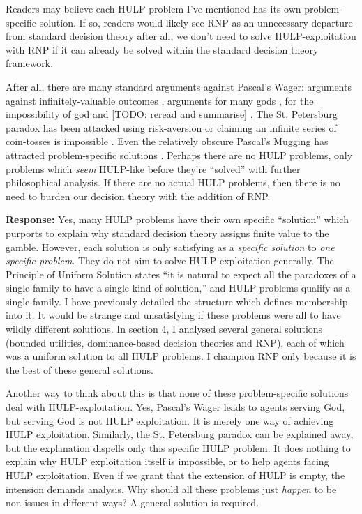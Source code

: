 \documentclass{article}
\providecommand{\DIFadd}[1]{{\protect\color{blue}\uwave{#1}}} %
\providecommand{\DIFdel}[1]{{\protect\color{red}\sout{#1}}}                      %
\providecommand{\DIFaddbegin}{} %
\providecommand{\DIFaddend}{} %
\providecommand{\DIFdelbegin}{} %
\providecommand{\DIFdelend}{} %
\begin{document}
Readers may believe each HULP problem I've mentioned has its own problem-specific solution. If so, readers would likely see RNP as an unnecessary departure from standard decision theory \textemdash{} after all, we don't need to solve \DIFdelbegin \DIFdel{HULP-exploitation }\DIFdelend \DIFaddbegin \DIFadd{HULP exploitation }\DIFaddend with RNP if it can already be solved within the standard decision theory framework.

After all, there are many standard arguments against Pascal's Wager: arguments against infinitely-valuable outcomes \citep{mcclennen1994pascal}, arguments for many gods \citep{saka2001pascal}, for the impossibility of god \citep{oppy1991rescher} and [TODO: reread and summarise] \citep{hajek2003waging}. The St. Petersburg paradox has been attacked using risk-aversion \citep{weirich1984st} or claiming an infinite series of coin-tosses is impossible \citep[pg. 154]{jeffrey1990logic}. Even the relatively obscure Pascal's Mugging has attracted problem-specific solutions \citep{baumann2009counting}. Perhaps there are no HULP problems, only problems which \textit{seem} HULP-like before they're ``solved'' with further philosophical analysis. If there are no actual HULP problems, then there is no need to burden our decision theory with the addition of RNP.

\textbf{Response:} Yes, many HULP problems have their own specific ``solution'' which purports to explain why standard decision theory assigns finite value to the gamble. However, each solution is only satisfying as a \textit{specific solution} to \textit{one specific problem}. They do not aim to solve HULP exploitation generally. The Principle of Uniform Solution states ``it is natural to expect all the paradoxes of a single family to have a single kind of solution,'' \citep[pg. 32]{priest1994structure} and HULP problems qualify as a single family. I have previously detailed the structure which defines membership into it. It would be strange and unsatisfying if these problems were all to have wildly different solutions. In section 4, I analysed several general solutions (bounded utilities, dominance-based decision theories and RNP), each of which was a uniform solution to all HULP problems. I champion RNP only because it is the best of these general solutions. 

Another way to think about this is that none of these problem-specific solutions deal with \DIFdelbegin \DIFdel{HULP-exploitation}\DIFdelend \DIFaddbegin \DIFadd{HULP exploitation}\DIFaddend . Yes, Pascal's Wager leads to agents serving God, but serving God is not HULP exploitation. It is merely one way of achieving HULP exploitation. Similarly, the St. Petersburg paradox can be explained away, but the explanation dispells only this specific HULP problem. It does nothing to explain why HULP exploitation itself is impossible, or to help agents facing HULP exploitation. Even if we grant that the extension of HULP is empty, the intension demands analysis. Why should all these problems just \textit{happen} to be non-issues in different ways? A general solution is required. 
\end{document}
